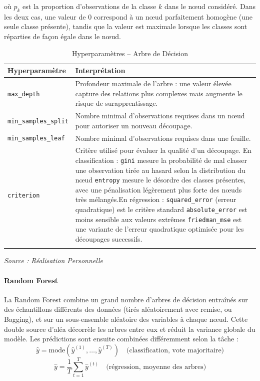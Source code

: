 \documentclass[a4paper,12pt, oneside]{article}
\begin{document}
où $p_k$ est la proportion d'observations de la classe $k$ dans le nœud considéré. Dans les deux cas, une valeur de 0 correspond à un nœud parfaitement homogène (une seule classe présente), tandis que la valeur est maximale lorsque les classes sont réparties de façon égale dans le nœud.

\begin{longtable}{|m{5cm}|m{12cm}|}
\hline
\textbf{Hyperparamètre} & \textbf{Interprétation} \\
\hline
\texttt{max\_depth} & Profondeur maximale de l'arbre : une valeur élevée capture des relations plus complexes mais augmente le risque de surapprentissage. \\
\hline
\texttt{min\_samples\_split} & Nombre minimal d'observations requises dans un nœud pour autoriser un nouveau découpage. \\
\hline
\texttt{min\_samples\_leaf} & Nombre minimal d'observations requises dans une feuille. \\
\hline
\texttt{criterion} & Critère utilisé pour évaluer la qualité d'un découpage. \newline En classification : \newline \texttt{gini} mesure la probabilité de mal classer une observation tirée au hasard selon la distribution du nœud \newline \texttt{entropy} mesure le désordre des classes présentes, avec une pénalisation légèrement plus forte des nœuds très mélangés.\newline En régression : \newline \texttt{squared\_error} (erreur quadratique) est le critère standard \newline \texttt{absolute\_error} est moins sensible aux valeurs extrêmes \newline \texttt{friedman\_mse} est une variante de l'erreur quadratique optimisée pour les découpages successifs. \\
\hline
\caption{Hyperparamètres -- Arbre de Décision}
\end{longtable}
\begin{center}
\vspace{-0.85cm}
\textit{Source : Réalisation Personnelle}
\end{center}

\paragraph{Random Forest\\}
La Random Forest combine un grand nombre d'arbres de décision entraînés sur des échantillons différents des données (tirés aléatoirement avec remise, ou Bagging), et sur un sous-ensemble aléatoire des variables à chaque nœud. Cette double source d'aléa décorrèle les arbres entre eux et réduit la variance globale du modèle. Les prédictions sont ensuite combinées différemment selon la tâche :
\[
\hat{y} = \text{mode}\left(\hat{y}^{(1)}, \dots, \hat{y}^{(T)}\right) \quad \text{(classification, vote majoritaire)}
\]
\[
\hat{y} = \frac{1}{T}\sum_{t=1}^{T} \hat{y}^{(t)} \quad \text{(régression, moyenne des arbres)}
\]
\end{document}
